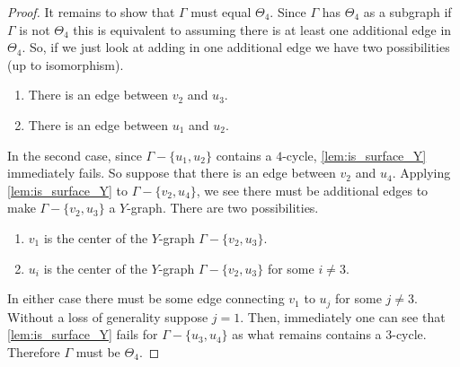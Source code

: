 \begin{proof}
    It remains to show that \(\Gamma\) must equal \(\Theta_4\). Since \(\Gamma\) has \(\Theta_4\) as a subgraph
    if \(\Gamma\) is not \(\Theta_4\) this is equivalent to assuming there is at least one additional edge in \(\Theta_4\).
    So, if we just look at adding in one additional edge we have two possibilities (up to isomorphism).
    \begin{enumerate}
        \item There is an edge between \(v_2\) and \(u_3\).
        \item There is an edge between \(u_1\) and \(u_2\).
    \end{enumerate}
    In the second case, since \(\Gamma - \{u_1, u_2\}\) contains a \(4\)-cycle, \ref{lem:is_surface_Y} immediately fails.
    So suppose that there is an edge between \(v_2\) and \(u_4\).
    Applying \ref{lem:is_surface_Y} to \(\Gamma - \{v_2, u_4\}\), we see there must be additional edges to make \(\Gamma - \{v_2, u_3\}\)
    a \(Y\)-graph.
    There are two possibilities.
    \begin{enumerate}
        \item \(v_1\) is the center of the \(Y\)-graph \(\Gamma - \{v_2, u_3\}\).
        \item \(u_i\) is the center of the \(Y\)-graph \(\Gamma - \{v_2, u_3\}\) for some \(i \neq 3\).
    \end{enumerate}
    In either case there must be some edge connecting \(v_1\) to \(u_j\) for some \(j \neq 3\).
    Without a loss of generality suppose \(j = 1\).
    Then, immediately one can see that \ref{lem:is_surface_Y} fails for \(\Gamma - \{u_3, u_4\}\)
    as what remains contains a \(3\)-cycle.
    Therefore \(\Gamma\) must be \(\Theta_4\).
\end{proof}

